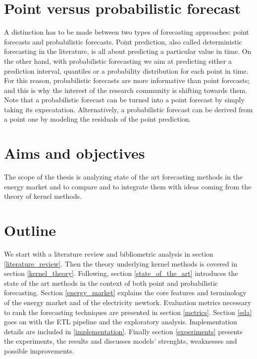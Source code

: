 \section{Point versus probabilistic forecast}
A distinction has to be made between two types of forecasting approaches: point forecasts and probabilistic forecasts.
Point prediction, also called deterministic forecasting in the literature, is all about predicting a particular value in time.
On the other hand, with probabilistic forecasting we aim at predicting either a prediction interval, quantiles or a probability distribution for each point in time. For this reason, probabilistic forecasts are more informative than point forecasts; and this is why the interest of the research community is shifting towards them.
Note that a probabilistic forecast can be turned into a point forecast by simply taking its expecatation.
Alternatively, a probabilistic forecast can be derived from a point one by modeling the residuals of the point prediction.



\section{Aims and objectives}


The scope of the thesis is analyzing state of the art forecasting methods in the energy market and to compare and to integrate them with ideas coming from the theory of kernel methods.  



\section{Outline}
We start with a literature review and bibliometric analysis in section \ref{literature_review}.
Then the theory underlying kernel methods is covered in section \ref{kernel_theory}. Following, section \ref{state_of_the_art} introduces the state of the art methods in the context of both point and probabilistic forecasting. Section \ref{energy_market} explains the core features and terminology of the energy market and of the electricity newtork.
Evaluation metrics necessary to rank the forecasting techniques are presented in section \ref{metrics}. Section \ref{eda} goes on with the ETL pipeline and the exploratory analysis. 
Implementation details are included in \ref{implementation}.
Finally section \ref{experiments} presents the experiments, the results and discusses models' strenghts, weaknesses and possible improvements.